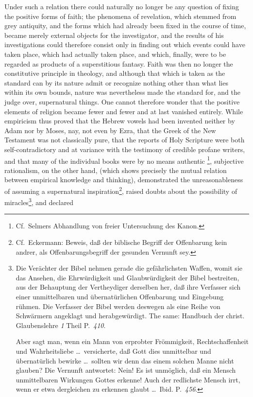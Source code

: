\documentclass[12pt]{book}
\newcommand{\opage}[1]{\marginnote{\footnotesize\textit{[#1]}}}
\begin{document}
\opage{91} %
Under such a relation there could naturally no longer be any question of fixing
the positive forms of faith; the phenomena of revelation, which stemmed from
grey antiquity, and the forms which had already been fixed in the course of
time, became merely external objects for the investigator, and the results of
his investigations could therefore consist only in finding out which events
could have taken place, which had actually taken place, and which, finally,
were to be regarded as products of a superstitious fantasy. Faith was then no
longer the constitutive principle in theology, and although that which is
taken as the standard can by its nature admit or recognize nothing other than
what lies within its own bounds, nature was nevertheless made the standard for,
and the judge over, supernatural things. One cannot therefore wonder that the
positive elements of religion became fewer and fewer and at last vanished
entirely. While empiricism thus proved that the Hebrew vowels had been
invented neither by Adam nor by Moses, nay, not even by Ezra, that the Greek
of the New Testament was not classically pure, that the reports of Holy
Scripture were both self-contradictory and at variance with the testimony of
credible profane writers, and that many of the individual books were by no
means authentic%
\opage{92}%
\setcounter{footnote}{0}%
\footnote{Cf.\ Selmers Abhandlung von freier Untersuchung des Kanon.},
subjective rationalism, on the other hand, (which shows precisely the mutual
relation between empirical knowledge and thinking), demonstrated the
unreasonableness of assuming a supernatural inspiration\footnote{Cf.\
Eckermann: Beweis, daß der biblische Begriff der Offenbarung kein andrer, als
Offenbarungsbegriff der gesunden Vernunft sey.}, raised doubts about the
possibility of miracles\footnote{Die Verächter der Bibel nehmen gerade die
gefährlichsten Waffen, womit sie das Ansehen, die Ehrwürdigkeit und
Glaubwürdigkeit der Bibel bestreiten, aus der Behauptung der Vertheydiger
derselben her, daß ihre Verfasser sich einer unmittelbaren und übernatürlichen
Offenbarung und Eingebung rühmen. Die Verfasser der Bibel werden deswegen als
eine Reihe von Schwärmern angeklagt und herabgewürdigt. The same: Handbuch der
christ. Glaubenslehre \textit{1} Theil P.~\textit{410}.\par
Aber sagt man, wenn ein Mann von erprobter Frömmigkeit, Rechtschaffenheit und
Wahrheitsliebe \ldots\ versicherte, daß Gott dies unmittelbar und übernatürlich
bewirke \ldots\ sollten wir denn das einem solchen Manne nicht glauben? Die
Vernunft antwortet: Nein! Es ist unmöglich, daß ein Mensch unmittelbaren
Wirkungen Gottes erkenne! Auch der redlichste Mensch irrt, wenn er etwa
dergleichen zu erkennen glaubt \ldots\ Ibid. P.~\textit{456}.}, and declared
\end{document}
